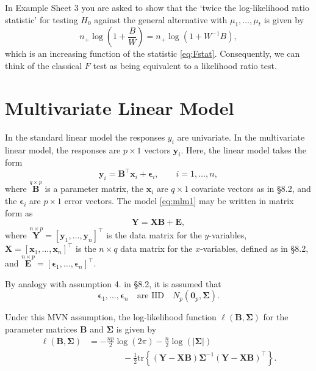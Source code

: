\documentclass[]{book}
\theoremstyle{definition}
\theoremstyle{definition}
\theoremstyle{definition}
\theoremstyle{remark}
\begin{document}
In Example Sheet 3 you are asked to show that the `twice the log-likelihood ratio statistic' for testing \(H_0\) against the general alternative with \(\mu_1, \ldots , \mu_t\) is given by
\begin{equation}
n_+ \log \left ( 1+ \frac{B}{W}  \right )=n_+ \log (1+W^{-1}B),
\label{eq:ANOVA2}
\end{equation}
which is an increasing function of the statistic \eqref{eq:Fstat}. Consequently, we can think of the classical \(F\) test as being equivalent to a likelihood ratio test.

\hypertarget{multivariate-linear-model}{%
\section{Multivariate Linear Model}\label{multivariate-linear-model}}

In the standard linear model the responses \(y_i\) are univariate. In the multivariate linear model, the responses are \(p \times 1\) vectors \(\boldsymbol y_i\). Here, the linear model takes the form
\begin{equation}
\boldsymbol y_i=\boldsymbol B^\top \boldsymbol x_i +{\pmb \epsilon}_i, \qquad i=1, \ldots , n,
\label{eq:mlm1}
\end{equation}
where \(\stackrel{q \times p}{\boldsymbol B}\) is a parameter matrix, the \(\boldsymbol x_i\) are \(q \times 1\) covariate vectors as in \S 8.2, and the \({\pmb \epsilon}_i\) are \(p \times 1\) error vectors. The model \eqref{eq:mlm1} may be written in matrix form as
\begin{equation}
\boldsymbol Y= \boldsymbol X\boldsymbol B+\boldsymbol E,
\label{eq:mlm2}
\end{equation}
where \(\stackrel{n \times p}{\boldsymbol Y}=[\boldsymbol y_1, \ldots , \boldsymbol y_n]^\top\) is the data matrix for the \(y\)-variables, \(\boldsymbol X=[\boldsymbol x_1, \ldots , \boldsymbol x_n]^\top\) is the \(n \times q\) data matrix for the \(x\)-variables, defined as in \S 8.2, and \(\stackrel{n \times p}{\boldsymbol E}=[{\pmb \epsilon}_1, \ldots , {\pmb \epsilon}_n]^\top\).

By analogy with assumption 4. in \S 8.2, it is assumed that
\begin{equation}
{\pmb \epsilon_1}, \ldots , {\pmb \epsilon}_n \quad \text{are
IID}\quad N_p({\mathbf 0}_p, \boldsymbol \Sigma).
\label{eq:MVNassumption}
\end{equation}

Under this MVN assumption, the log-likelihood function \(\ell(\boldsymbol B, \boldsymbol \Sigma)\) for the parameter matrices \(\boldsymbol B\) and \(\boldsymbol \Sigma\) is given by
\begin{align}
\ell(\boldsymbol B, \boldsymbol \Sigma)&=-\frac{np}{2}\log(2\pi) -\frac{n}{2}\log(\vert \boldsymbol \Sigma\vert) \nonumber \\
& \qquad \qquad -\frac{1}{2}\text{tr}\left \{
(\boldsymbol Y-\boldsymbol X\boldsymbol B) \boldsymbol \Sigma^{-1} (\boldsymbol Y- \boldsymbol X\boldsymbol B)^\top\right \}.
\label{eq:MVNlik}
\end{align}
\end{document}
